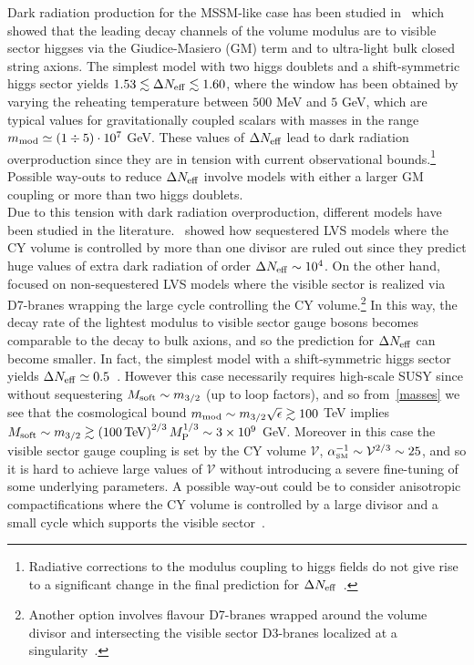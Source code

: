 \documentclass[12pt,a4paper]{book}
\def\SM{{\scriptscriptstyle \rm SM}}
\newcommand\vo{{\mathcal{V}}}
\begin{document}
Dark radiation production for the MSSM-like case has been studied in~\cite{Cicoli:2012aq, Higaki:2012ar} which showed that the leading decay channels of the volume modulus are to visible sector higgses via the Giudice-Masiero (GM) term and to ultra-light bulk closed string axions. The simplest model with two higgs doublets and a shift-symmetric higgs sector yields $1.53 \lesssim \Delta N_{\rm eff}\lesssim 1.60$, where the window has been obtained by varying the reheating temperature between $500$ MeV and $5$ GeV, which are typical values for gravitationally coupled scalars with masses in the range $m_{\rm mod}\simeq (1 \div 5) \cdot 10^7$ GeV. These values of $\Delta N_{\rm eff}$ lead to dark radiation overproduction since they are in tension with current observational bounds.\footnote{Radiative corrections to the modulus coupling to higgs fields do not give rise to a significant change in the final prediction for $\Delta N_{\rm eff}$~\cite{Angus:2013zfa}.} Possible way-outs to reduce $\Delta N_{\rm eff}$ involve models with either a larger GM coupling or more than two higgs doublets.\\

Due to this tension with dark radiation overproduction, different models have been studied in the literature.~\cite{Angus:2014bia} showed how sequestered LVS models where the CY volume is controlled by more than one divisor are ruled out since they predict huge values of extra dark radiation of order $\Delta N_{\rm eff}\sim 10^4$. On the other hand,~\cite{Hebecker:2014gka} focused on non-sequestered LVS models where the visible sector is realized via D7-branes wrapping the large cycle controlling the CY volume.\footnote{Another option involves flavour D7-branes wrapped around the volume divisor and intersecting the visible sector D3-branes localized at a singularity~\cite{Hebecker:2014gka}.} In this way, the decay rate of the lightest modulus to visible sector gauge bosons becomes comparable to the decay to bulk axions, and so the prediction for $\Delta N_{\rm eff}$ can become smaller. In fact, the simplest model with a shift-symmetric higgs sector yields $\Delta N_{\rm eff}\simeq 0.5$~\cite{Hebecker:2014gka}. However this case necessarily requires high-scale SUSY since without sequestering $M_{\rm soft}\sim m_{3/2}$ (up to loop factors), and so from~\eqref{masses} we see that the cosmological bound $m_{\rm mod}\sim m_{3/2} \sqrt{\epsilon}\gtrsim 100$ TeV implies $M_{\rm soft} \sim m_{3/2} \gtrsim \left(100\,{\rm TeV}\right)^{2/3} M_{\rm P}^{1/3}\sim 3 \times 10^9$ GeV. Moreover in this case the visible sector gauge coupling is set by the CY volume $\vo$, $\alpha_\SM^{-1} \sim \vo^{2/3} \sim 25$, and so it is hard to achieve large values of $\vo$ without introducing a severe fine-tuning of some underlying parameters. A possible way-out could be to consider anisotropic compactifications where the CY volume is controlled by a large divisor and a small cycle which supports the visible sector~\cite{Cicoli:2011qg, Cicoli:2011yy, Angus:2012dd}.\\
\end{document}
